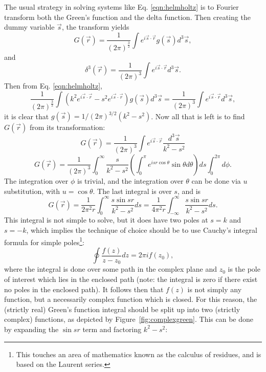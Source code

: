 The usual strategy in solving systems like Eq. \eqref{eqn:helmholtz} is to Fourier transform both the Green's function and the delta function. Then creating the dummy variable $\vec{s}$, the transform yields
%
\begin{equation} \nonumber
G(\vec{r})=\frac{1}{(2\pi)^\frac{3}{2}}\int e^{i\vec{s}\cdot\vec{r}} g(\vec{s})d^3\vec{s},
\end{equation}
and
%
\begin{equation} \nonumber
\delta^3(\vec{r})=\frac{1}{(2\pi)^3}\int e^{i\vec{s}\cdot\vec{r}} d^3\vec{s}.
\end{equation}
Then from Eq. \eqref{eqn:helmholtz},
%
\begin{equation} \nonumber
\frac{1}{(2\pi)^\frac{3}{2}}\int (k^2e^{i\vec{s}\cdot\vec{r}}-s^2e^{i\vec{s}\cdot\vec{r}})g(\vec{s})d^3\vec{s}=\frac{1}{(2\pi)^3}\int e^{i\vec{s}\cdot\vec{r}}d^3\vec{s},
\end{equation}
it is clear that $g(\vec{s})=1/(2\pi)^{3/2}(k^2-s^2)$. Now all that is left is to find $G(\vec{r})$ from its transformation:
%
\begin{equation} \nonumber
G(\vec{r})=\frac{1}{(2\pi)^3}\int e^{i\vec{s}\cdot\vec{r}}\frac{d^3\vec{s}}{k^2-s^2}
\end{equation}
%
\begin{equation} \nonumber
G(\vec{r})=\frac{1}{(2\pi)^3}\int_0^\infty \frac{s}{k^2-s^2} \left(\int_0^\pi e^{isr\cos\theta}\sin\theta d\theta\right)ds \int_0^{2\pi}d\phi.
\end{equation}
The integration over $\phi$ is trivial, and the integration over $\theta$ can be done via $u$ substitution, with $u=\cos\theta$. The last integral is over $s$, and is
%
\begin{equation} \nonumber
G(\vec{r})=\frac{1}{2\pi^2r}\int_0^\infty\frac{s\sin{sr}}{k^2-s^2}ds=\frac{1}{4\pi^2r}\int_{-\infty}^\infty\frac{s\sin{sr}}{k^2-s^2}ds.
\end{equation}
This integral is not simple to solve, but it does have two poles at $s=k$ and $s=-k$, which implies the technique of choice should be to use Cauchy's integral formula for simple poles\footnote{This touches an area of mathematics known as the calculus of residues, and is based on the Laurent series.}:
%
\begin{equation}
\label{eqn:cauchy}
\oint \frac{f(z)}{z-z_0}dz=2\pi if(z_0),
\end{equation}
where the integral is done over some path in the complex plane and $z_0$ is the pole of interest which lies in the enclosed path (note: the integral is zero if there exist no poles in the enclosed path). It follows then that $f(z)$ is not simply any function, but a necessarily complex function which is closed. For this reason, the (strictly real) Green's function integral should be split up into two (strictly complex) functions, as depicted by Figure~\ref{fig:complexgreen}. This can be done by expanding the $\sin sr$ term and factoring $k^2-s^2$:

